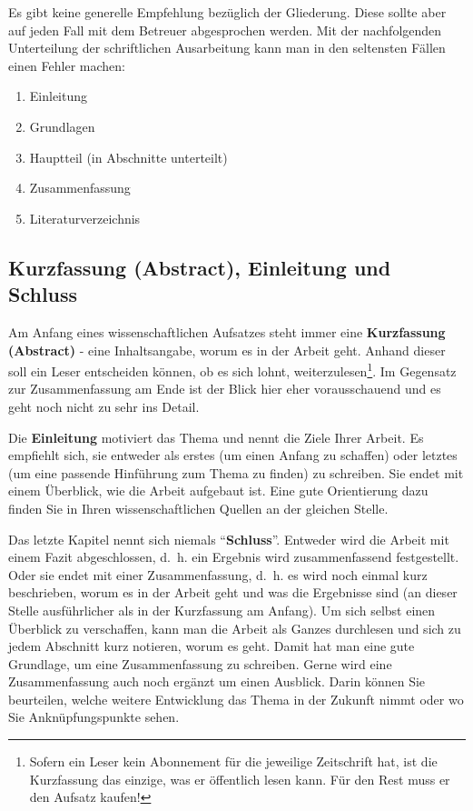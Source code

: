 \documentclass[final,bibliography=totocnumbered]{include/sikseminar}
\begin{document}
Es gibt keine generelle Empfehlung bezüglich der Gliederung. Diese sollte aber auf jeden Fall mit dem Betreuer abgesprochen werden. Mit der nachfolgenden Unterteilung der schriftlichen Ausarbeitung kann man in den seltensten Fällen einen Fehler machen:
\begin{enumerate}
	\item Einleitung
	\item Grundlagen
	\item Hauptteil (in Abschnitte unterteilt)
	\item Zusammenfassung
	\item Literaturverzeichnis
\end{enumerate}

\subsection{Kurzfassung (Abstract), Einleitung und Schluss}
Am Anfang eines wissenschaftlichen Aufsatzes steht immer eine \textbf{Kurzfassung (Abstract)} - eine Inhaltsangabe, worum es in der Arbeit geht. Anhand dieser soll ein Leser entscheiden können, ob es sich lohnt, weiterzulesen\footnote{Sofern ein Leser kein Abonnement für die jeweilige Zeitschrift hat, ist die Kurzfassung das einzige, was er öffentlich lesen kann. Für den Rest muss er den Aufsatz kaufen!}. Im Gegensatz zur Zusammenfassung am Ende ist der Blick hier eher vorausschauend und es geht noch nicht zu sehr ins Detail.

Die \textbf{Einleitung} motiviert das Thema und nennt die Ziele Ihrer Arbeit. Es empfiehlt sich, sie entweder als erstes (um einen Anfang zu schaffen) oder letztes (um eine passende Hinführung zum Thema zu finden) zu schreiben. Sie endet mit einem Überblick, wie die Arbeit aufgebaut ist. Eine gute Orientierung dazu finden Sie in Ihren wissenschaftlichen Quellen an der gleichen Stelle.

Das letzte Kapitel nennt sich niemals "`\textbf{Schluss}"'. Entweder wird die Arbeit mit einem Fazit abgeschlossen, d.~h. ein Ergebnis wird zusammenfassend festgestellt. Oder sie endet mit einer Zusammenfassung, d.~h. es wird noch einmal kurz beschrieben, worum es in der Arbeit geht und was die Ergebnisse sind (an dieser Stelle ausführlicher als in der Kurzfassung am Anfang). Um sich selbst einen Überblick zu verschaffen, kann man die Arbeit als Ganzes durchlesen und sich zu jedem Abschnitt kurz notieren, worum es geht. Damit hat man eine gute Grundlage, um eine Zusammenfassung zu schreiben. Gerne wird eine Zusammenfassung auch noch ergänzt um einen Ausblick. Darin können Sie beurteilen, welche weitere Entwicklung das Thema in der Zukunft nimmt oder wo Sie Anknüpfungspunkte sehen.
\end{document}
